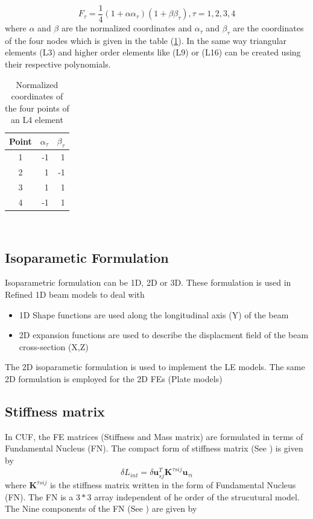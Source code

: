 \documentclass[a4paper,12pt]{article}
\begin{document}
\begin{equation}
F_\tau = \frac{1}{4}(1+\alpha\alpha_\tau)(1+\beta\beta_\tau), \tau = 1,2,3,4 
\label{shapefunc} 
\end{equation}
where $\alpha$ and $\beta$ are the normalized coordinates and $\alpha_\tau$ and $\beta_\tau$ are the coordinates of the four nodes which is given in the table (\ref{tab:table1}). In the same way triangular elements (L3) and  higher order elements like (L9) or (L16) can be created using their respective polynomials.
\begin{table}[h!]
  \begin{center}
     \begin{tabular}{c|r|r} 
      \textbf{Point} & \textbf{$\alpha_\tau$} & \textbf{$\beta_\tau$}\\
      \hline
      1 & -1 &  1\\
      2 &  1 & -1\\
      3 &  1 &  1\\
      4 & -1 &  1 
    \end{tabular}
    \caption{Normalized coordinates of the four     points of an L4 element}
    \label{tab:table1}
  \end{center}
\end{table}\\

\newpage
\subsection*{Isoparametic Formulation}
\indent\indent\indent\indent Isoparametric formulation can be 1D, 2D or 3D. These formulation is used in Refined 1D beam models to deal with
\begin{itemize}
\item 1D Shape functions are used along the longitudinal axis (Y) of the beam
\item 2D expansion functions are used to describe the displacment field of the beam cross-section (X,Z)
\end{itemize}
The 2D isoparametic formulation is used to implement the LE models. The same 2D formulation is employed for the 2D FEs (Plate models)

\subsection*{Stiffness matrix}
\indent\indent\indent\indent In CUF, the FE matrices (Stiffness and Mass matrix) are formulated in terms of Fundamental Nucleus (FN). The compact form of stiffness matrix (See \cite{carrera2013use}) is given by
\begin{equation}
\delta L_{int} = \delta \textbf{u}_{sj}^{T} \textbf{K}^{\tau s i j} \textbf{u}_{\tau i}
\label{Internal}   
\end{equation}
where $\textbf{K}^{\tau s i j}$ is the stiffness matrix written in the form of Fundamental Nucleus (FN). The FN is a $3*3$ array independent of he order of the strucutural model. The Nine components of the FN (See \cite{carrera2014finite}) are given by\\
\end{document}
